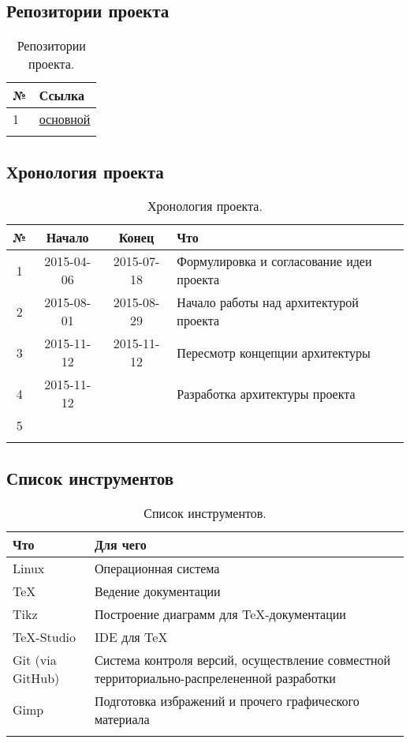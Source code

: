 \documentclass[12pt,a4paper,fullpage,titlepage]{article}
\begin{document}
\subsection{Репозитории проекта}
\begin{table}[h]
	\begin{tabularx}{\textwidth}{|l|X|}
		\hline
		№ & Ссылка \\
		\hline
		1 & \href{https://github.com/taptap/ladders}{основной} \\
		\hline
		& \\
		\hline
	\end{tabularx}
	\caption{Репозитории проекта.}
\end{table}

\subsection{Хронология проекта}
\begin{table}[h]
\begin{tabularx}{\textwidth}{|c|c|c|X|}
	\hline
	№ & Начало & Конец & Что\\
	\hline
	1 & 2015-04-06 & 2015-07-18 & Формулировка и согласование идеи проекта \\
	\hline
	2 & 2015-08-01 & 2015-08-29 & Начало работы над архитектурой проекта \\
	\hline
	3 & 2015-11-12 & 2015-11-12 & Пересмотр концепции архитектуры \\
	\hline
	4 & 2015-11-12 &  & Разработка архитектуры проекта\\
	\hline
	5 &  &  &  \\
	\hline
	&  &  &  \\
	\hline
\end{tabularx}
\caption{Хронология проекта.}
\end{table}

\newpage
\subsection{Список инструментов}
\begin{table}[h]
	\begin{tabularx}{\textwidth}{|l|X|}
		\hline
		Что & Для чего \\
		\hline
		Linux & Операционная система\\
		\hline
		\TeX & Ведение документации\\
		\hline
		Tikz & Построение диаграмм для \TeX-документации\\
		\hline
		\TeX-Studio & IDE для \TeX \\
		\hline
		Git (via GitHub) & Система контроля версий, осуществление совместной территориально-распрелененной разработки \\
		\hline
		Gimp & Подготовка избражений и прочего графического материала \\
		\hline
		& \\
		\hline
	\end{tabularx}
	\caption{Список инструментов.}
\end{table}


\end{document}
